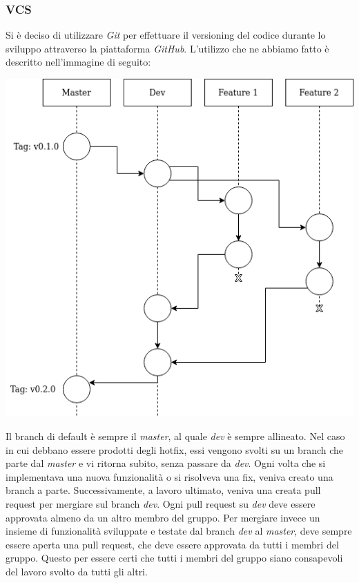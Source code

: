 \documentclass[a4paper,10pt]{article}
\begin{document}
    \subsubsection{VCS}
    Si è deciso di utilizzare \textit{Git} per effettuare il versioning del codice durante lo sviluppo attraverso la piattaforma \textit{GitHub}.
    L’utilizzo che ne abbiamo fatto è descritto nell'immagine di seguito:
    \begin{center}
        \includegraphics[scale=0.5]{git-workflow-1-1}
    \end{center}
    Il branch di default è sempre il \textit{master}, al quale \textit{dev} è sempre allineato.
    Nel caso in cui debbano essere prodotti degli hotfix, essi vengono svolti su un branch che parte dal \textit{master} e vi ritorna subito, senza passare da \textit{dev}.
    Ogni volta che si implementava una nuova funzionalità o si risolveva una fix, veniva creato una branch a parte.
    Successivamente, a lavoro ultimato, veniva una creata pull request per mergiare sul branch \textit{dev}.
    Ogni pull request su \textit{dev} deve essere approvata almeno da un altro membro del gruppo.
    Per mergiare invece un insieme di funzionalità sviluppate e testate dal branch \textit{dev} al \textit{master}, deve sempre essere aperta una pull request, che deve essere approvata da tutti i membri del gruppo.
    Questo per essere certi che tutti i membri del gruppo siano consapevoli del lavoro svolto da tutti gli altri.
\end{document}
